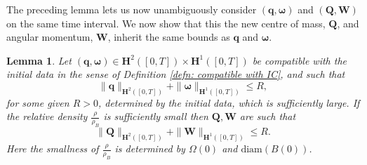 \documentclass[a4paper]{amsart}
\numberwithin{equation}{section}
\theoremstyle{plain}
\newtheorem{lemma}[theorem]{Lemma}
\newcommand{\mbf}[1]{\mathbf{#1}}
\begin{document}
The preceding lemma lets us now unambiguously consider $(\mbf{q}, \boldsymbol{\omega})$ and $(\mbf{Q}, \mbf{W})$ on the same time interval.
We now show that this the new centre of mass, $\mbf{Q}$, and angular momentum, $\mbf{W}$, inherit the same bounds as $\mbf{q}$ and $\boldsymbol{\omega}$.
\begin{lemma}
	\label{lemma: non degeneracy2}
    Let $(\mbf{q}, \boldsymbol{\omega}) \in \mbf{H}^2([0,T]) \times \mbf{H}^1([0,T])$ be compatible with the initial data in the sense of Definition \ref{defn: compatible with IC}, and such that
    \[ \|\mbf{q}\|_{\mbf{H}^2([0,T])} + \|\boldsymbol{\omega}\|_{\mbf{H}^1([0,T])} \leq R, \]
    for some given $R > 0$, determined by the initial data, which is sufficiently large.
    If the relative density $\frac{\rho}{\rho_B}$ is sufficiently small then $\mbf{Q}, \mbf{W}$ are such that
    \[ \|\mbf{Q}\|_{\mbf{H}^2([0,T])} + \|\mbf{W}\|_{\mbf{H}^1([0,T])} \leq R. \]
    Here the smallness of $\frac{\rho}{\rho_B}$ is determined by $\Omega(0)$ and $\mathrm{diam}(B(0))$.
\end{lemma}
\end{document}
